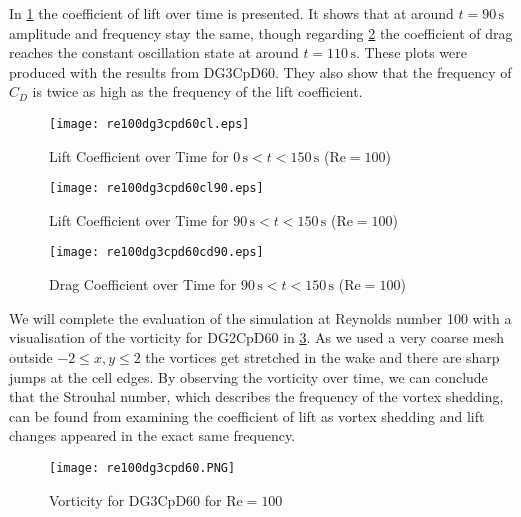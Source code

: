 In \cref{osci100} the coefficient of lift over time is presented. It shows that at around $t=90\,\text{s}$ amplitude and frequency stay the same, though regarding 
\cref{cdosci100} the coefficient of drag reaches the constant oscillation state at around $t=110\,\text{s}$. These plots were produced with the results from DG3CpD60. They also show that the frequency of $C_D$ is twice as high as the frequency of the lift coefficient. 
\begin{figure}[htp]	
	\centering
	\texttt{[image: re100dg3cpd60cl.eps]}
	\caption{Lift Coefficient over Time for $0\,\text{s}<t<150\,\text{s}$ ($\text{Re}=100$)}
	\label{osci100}	
\end{figure}
\begin{figure}[htp]	
	\begin{minipage}[b]{0.45\textwidth}
		\centering
		\texttt{[image: re100dg3cpd60cl90.eps]}
		\caption{Lift Coefficient over Time for $90\,\text{s}<t<150\,\text{s}$ ($\text{Re}=100$)}
		\label{cl10090}
	\end{minipage}
	\quad
	\begin{minipage}[b]{0.45\textwidth}
		\centering
		\texttt{[image: re100dg3cpd60cd90.eps]}
		\caption{Drag Coefficient over Time for $90\,\text{s}<t<150\,\text{s}$ ($\text{Re}=100$)}
		\label{cdosci100}	
	\end{minipage}
\end{figure}
		
		We will complete the evaluation of the simulation at Reynolds number 100 with a visualisation of the vorticity for DG2CpD60 in \cref{fig:vorticity100}. As we used a very coarse mesh outside $-2\leq x,y \leq 2$ the vortices get stretched in the wake and there are sharp jumps at the cell edges. By observing the vorticity over time, we can conclude that the Strouhal number, which describes the frequency of the vortex shedding, can be found from examining the coefficient of lift as vortex shedding and lift changes appeared in the exact same frequency.
		\begin{figure}[htp]
			\centering
			\texttt{[image: re100dg3cpd60.PNG]}
			\caption{Vorticity for DG3CpD60 for $\text{Re} = 100$}
			\label{fig:vorticity100}
		\end{figure}
		
		\newpage
